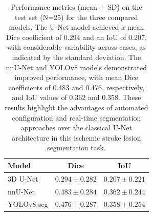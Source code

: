 \documentclass[12pt]{article}
\begin{document}
\begin{table}[tp]
\centering
\caption{Performance metrics (mean $\pm$ SD) on the test set (N=25) for the three compared models. The U-Net model achieved a mean Dice coefficient of 0.294 and an IoU of 0.207, with considerable variability across cases, as indicated by the standard deviation. The nnU-Net and YOLOv8 models demonstrated improved performance, with mean Dice coefficients of 0.483 and 0.476, respectively, and IoU values of 0.362 and 0.358. These results highlight the advantages of automated configuration and real-time segmentation approaches over the classical U-Net architecture in this ischemic stroke lesion segmentation task.}\label{tab:comparative_metrics}
\begin{tabular}{lcc}
\toprule
Model & Dice & IoU \\
\midrule
3D U-Net       & $0.294 \pm 0.282$ & $0.207 \pm 0.221$ \\
nnU-Net        & $0.483 \pm 0.284$ & $0.362 \pm 0.244$ \\
YOLOv8-seg     & $0.476 \pm 0.287$ & $0.358 \pm 0.254$ \\
\bottomrule
\end{tabular}
\end{table}
%
\end{document}
